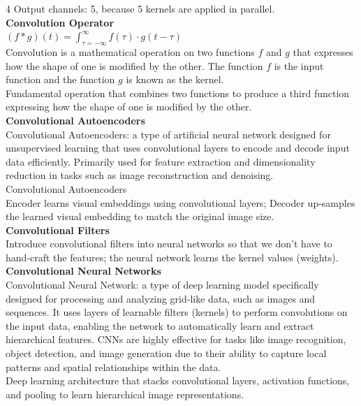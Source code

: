 \documentclass[8pt]{extarticle}
\begin{document}
\begin{multicols}{4}
Output channels: 5, because 5 kernels are applied in parallel.\\
\vspace{2pt}\textbf{Convolution Operator}\\
$(f \ast g)(t) = \int_{\tau = -\infty}^{\infty} f(\tau)\cdot g(t-\tau)$\\
Convolution is a mathematical operation on two functions $f$ and $g$ that expresses how the shape of one is modified by the other. The function $f$ is the input function and the function $g$ is known as the kernel.\\
Fundamental operation that combines two functions to produce a third function expressing how the shape of one is modified by the other.\\
\vspace{2pt}\textbf{Convolutional Autoencoders}\\
Convolutional Autoencoders: a type of artificial neural network designed for unsupervised learning that uses convolutional layers to encode and decode input data efficiently. Primarily used for feature extraction and dimensionality reduction in tasks such as image reconstruction and denoising.\\
Convolutional Autoencoders\\
Encoder learns visual embeddings using convolutional layers; Decoder up‑samples the learned visual embedding to match the original image size.\\
\vspace{2pt}\textbf{Convolutional Filters}\\
Introduce convolutional filters into neural networks so that we don’t have to hand‑craft the features; the neural network learns the kernel values (weights).\\
\vspace{2pt}\textbf{Convolutional Neural Networks}\\
Convolutional Neural Network: a type of deep learning model specifically designed for processing and analyzing grid‑like data, such as images and sequences. It uses layers of learnable filters (kernels) to perform convolutions on the input data, enabling the network to automatically learn and extract hierarchical features. CNNs are highly effective for tasks like image recognition, object detection, and image generation due to their ability to capture local patterns and spatial relationships within the data.\\
Deep learning architecture that stacks convolutional layers, activation functions, and pooling to learn hierarchical image representations.\\

\end{multicols}
\end{document}
